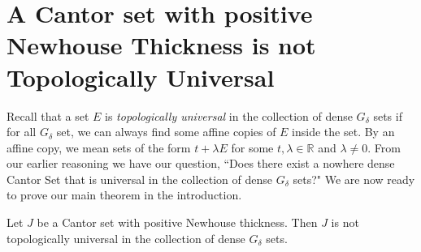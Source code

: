 \section{A Cantor set with positive Newhouse Thickness is not Topologically Universal}

Recall that a set $E$ is  {\it topologically universal} in the collection of dense $G_{\delta}$ sets if for all $G_{\delta}$ set,  we can  always find some affine copies of $E$ inside the set. By an affine copy, we  mean sets of  the form $t+\lambda E$ for some $t, \lambda \in{\mathbb R}$ and $\lambda\ne 0$. From our earlier reasoning we have our question, ``Does there exist a nowhere dense Cantor Set that is universal in the collection of dense $G_\delta$ sets?" We are now ready to prove our main theorem in the introduction. 

\begin{theorem}\label{theorem_positive_NW}
Let $J$ be a Cantor set with positive Newhouse thickness.  Then $J$ is not topologically universal in the collection of dense $G_\delta$ sets.
\end{theorem}

